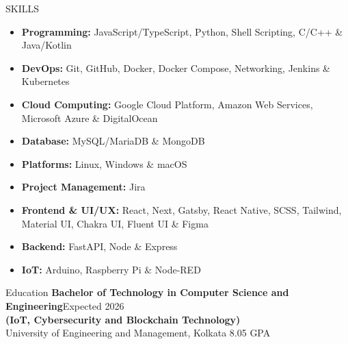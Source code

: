 \documentclass{resume}
\begin{document}
\vspace{-0.4em}
\begin{rSection}{SKILLS}
  \begin{itemize}
    \item \textbf{Programming:} JavaScript/TypeScript, Python, Shell Scripting, C/C++ \& Java/Kotlin
          \vspace{-0.2em}
    \item \textbf{DevOps:} Git, GitHub, Docker, Docker Compose, Networking, Jenkins \& Kubernetes
          \vspace{-0.2em}
    \item \textbf{Cloud Computing:} Google Cloud Platform, Amazon Web Services, Microsoft Azure \& DigitalOcean
          \vspace{-0.2em}
    \item \textbf{Database:} MySQL/MariaDB \& MongoDB
          \vspace{-0.2em}
    \item \textbf{Platforms:} Linux, Windows \& macOS
    \item \textbf{Project Management:} Jira
          \vspace{-0.2em}
    \item \textbf{Frontend \& UI/UX:} React, Next, Gatsby, React Native, SCSS, Tailwind, Material UI, Chakra UI, Fluent UI \& Figma
          \vspace{-0.2em}
    \item \textbf{Backend:} FastAPI, Node \& Express
          \vspace{-0.2em}
    \item \textbf{IoT:} Arduino, Raspberry Pi \& Node-RED
  \end{itemize}
\end{rSection}
\vspace{-0.4em}
\begin{rSection}{Education}
  \textbf{Bachelor of Technology in Computer Science and Engineering}\hfill {Expected 2026}\\
  \textbf{(IoT, Cybersecurity and Blockchain Technology)}\\
  University of Engineering and Management, Kolkata \hfill  8.05 GPA
\end{rSection}
\vspace{-0.4em}
\end{document}

